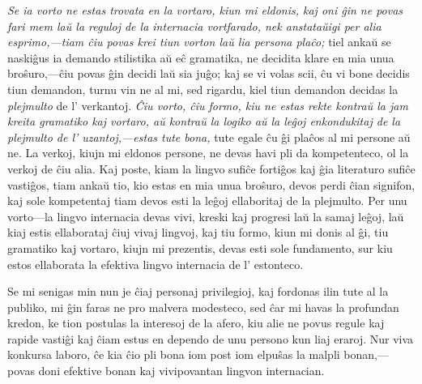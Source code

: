 \documentclass[12pt,twoside]{book}
\begin{document}
\emph{Se ia vorto ne estas trovata en la vortaro, kiun mi eldonis, kaj oni ĝin ne povas fari mem laŭ la reguloj de la internacia vortfarado, nek anstataŭigi per alia esprimo,—tiam ĉiu povas krei tiun vorton laŭ lia persona plaĉo;} tiel ankaŭ se naskiĝus ia demando stilistika aŭ eĉ gramatika, ne decidita klare en mia unua broŝuro,—ĉiu povas ĝin decidi laŭ sia juĝo; kaj se vi volas scii, ĉu vi bone decidis tiun demandon, turnu vin ne al mi, sed rigardu, kiel tiun demandon decidas la \emph{plejmulto} de l' verkantoj. \emph{Ĉiu vorto, ĉiu formo, kiu ne estas rekte kontraŭ la jam kreita gramatiko kaj vortaro, aŭ kontraŭ la logiko aŭ la leĝoj enkondukitaj de la plejmulto de l' uzantoj,—estas tute bona,} tute egale ĉu ĝi plaĉos al mi persone aŭ ne. La verkoj, kiujn mi eldonos persone, ne devas havi pli da kompetenteco, ol la verkoj de ĉiu alia. Kaj poste, kiam la lingvo sufiĉe fortiĝos kaj ĝia literaturo sufiĉe vastiĝos, tiam ankaŭ tio, kio estas en mia unua broŝuro, devos perdi ĉian signifon, kaj sole kompetentaj tiam devos esti la leĝoj ellaboritaj de la plejmulto. Per unu vorto—la lingvo internacia devas vivi, kreski kaj progresi laŭ la samaj leĝoj, laŭ kiaj estis ellaborataj ĉiuj vivaj lingvoj, kaj tiu formo, kiun mi donis al ĝi, tiu gramatiko kaj vortaro, kiujn mi prezentis, devas esti sole fundamento, sur kiu estos ellaborata la efektiva lingvo internacia de l' estonteco.

Se mi senigas min nun je ĉiaj personaj privilegioj, kaj fordonas ilin tute al la publiko, mi ĝin faras ne pro malvera modesteco, sed ĉar mi havas la profundan kredon, ke tion postulas la interesoj de la afero, kiu alie ne povus regule kaj rapide vastiĝi kaj ĉiam estus en dependo de unu persono kun liaj eraroj. Nur viva konkursa laboro, ĉe kia ĉio pli bona iom post iom elpuŝas la malpli bonan,—povas doni efektive bonan kaj vivipovantan lingvon internacian.
\end{document}
